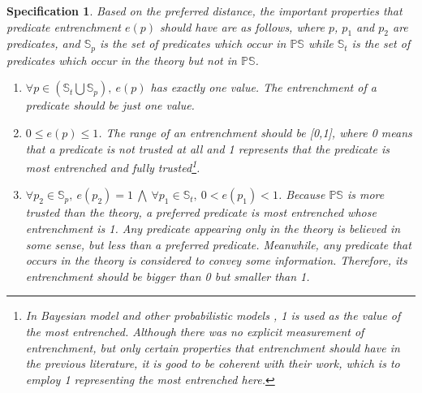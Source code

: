 \documentclass[11pt,letterpaper]{article}
\newtheorem{spec}{Specification}
\newcommand{\ps}{\mathbb{PS}}
\begin{document}
\begin{spec}\label{spec:pe}
Based on the  preferred distance, the important properties that predicate entrenchment $e(p)$ should have are as follows, where $p$, $p_{1}$ and $p_{2}$ are predicates, and $\mathbb{S}_{p}$ is the set of predicates which occur in $\ps$ while $\mathbb{S}_{t}$ is the set of predicates which occur in the theory but not in $\ps$.
\begin{enumerate}
\item $\forall p \in (\mathbb{S}_{t} \bigcup \mathbb{S}_{p}),\ e(p)$ has exactly one value.\newline
\textnormal{The entrenchment of a predicate should be just one value.}
\item $ 0 \leq e(p) \leq 1$. \newline
\textnormal{The range of an entrenchment should be [0,1], where 0 means that a predicate is not trusted at all and 1  represents that the predicate is most entrenched and fully trusted\footnote{In  Bayesian model and other probabilistic models \cite{gardenfors1988knowledge}, 1 is used as the value of the most entrenched. Although there was no explicit measurement of entrenchment, but only  certain properties that entrenchment should have in the previous literature, it is good to be coherent with their work, which is to employ 1 representing the most entrenched here.}.}

\item $\forall p_{2} \in \mathbb{S}_{p},\  e(p_{2})=1\ \bigwedge \  \forall p_{1}\in \mathbb{S}_{t},\  0< e(p_{1}) < 1$.\newline
\textnormal{Because $\ps$ is more trusted than the theory, a preferred predicate is most entrenched whose entrenchment is 1. Any predicate appearing only in the theory is believed in some sense, but less than a preferred predicate. Meanwhile, any predicate that occurs in the theory is considered to convey some information. Therefore, its entrenchment should be bigger than 0 but smaller than 1.  }


\end{enumerate}
\end{spec}
\end{document}

